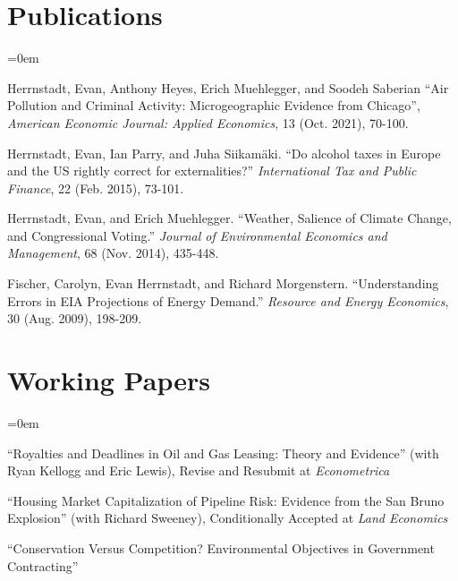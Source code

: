\documentclass[letterpaper]{article}
\renewenvironment{itemize}{
  \vspace{-0.5em}
  \begin{list}{}{
	\itemsep=0em
    \setlength{\leftmargin}{1.5em}
  }
}{
  \end{list}
}
\begin{document}
\section*{Publications}

\begin{itemize}
\item Herrnstadt, Evan, Anthony Heyes, Erich Muehlegger, and Soodeh Saberian “Air Pollution and Criminal Activity: Microgeographic Evidence from Chicago”, \textit{American Economic Journal: Applied Economics}, 13 (Oct. 2021), 70-100.

\item Herrnstadt, Evan, Ian Parry, and Juha Siikamäki. “Do alcohol taxes in Europe and the US rightly correct for externalities?” \textit{International Tax and Public Finance}, 22 (Feb. 2015), 73-101.

\item Herrnstadt, Evan, and Erich Muehlegger.  “Weather, Salience of Climate Change, and Congressional Voting.” \textit{Journal of Environmental Economics and Management}, 68 (Nov. 2014), 435-448.

\item Fischer, Carolyn, Evan Herrnstadt, and Richard Morgenstern. “Understanding Errors in EIA Projections of Energy Demand.”  \textit{Resource and Energy Economics}, 30 (Aug. 2009), 198-209.
\end{itemize}

\section*{Working Papers}

\begin{itemize}
\item “Royalties and Deadlines in Oil and Gas Leasing: Theory and Evidence” 
(with Ryan Kellogg and Eric Lewis), Revise and Resubmit at \emph{Econometrica}

\item “Housing Market Capitalization of Pipeline Risk: Evidence from the San Bruno Explosion”
(with Richard Sweeney), Conditionally Accepted at \emph{Land Economics}

\item “Conservation Versus Competition? Environmental Objectives in Government Contracting” 

\end{itemize}
\end{document}
